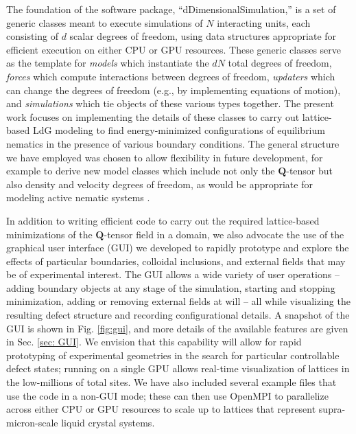 \documentclass[utf8]{frontiersFPHY} %
\newcommand{\Q}{\mathbf{Q}}
\begin{document}
The foundation of the software package, ``dDimensionalSimulation,'' is a set of generic classes meant to execute simulations of $N$ interacting units, each consisting of $d$ scalar degrees of freedom, using data structures appropriate for efficient execution on either CPU or GPU resources. These generic classes serve as the template for \emph{models} which instantiate the $dN$ total degrees of freedom, \emph{forces} which compute interactions between degrees of freedom, \emph{updaters} which can change the degrees of freedom (e.g., by implementing equations of motion), and \emph{simulations} which tie objects of these various types together. The present work focuses on implementing the details of these classes to carry out lattice-based LdG modeling to find energy-minimized configurations of equilibrium nematics in the presence of various boundary conditions. The general structure we have employed was chosen to allow flexibility in future development, for example to derive new model classes which include not only the $\Q$-tensor but also density and velocity degrees of freedom, as would be appropriate for modeling active nematic systems \citep{2019arXiv190601129C,marenduzzo2007steady,cates2009lattice,giomi2011excitable}. 

In addition to writing efficient code to carry out the required lattice-based minimizations of the $\Q$-tensor field in a domain, we also advocate the use of the graphical user interface (GUI) we developed to rapidly prototype and explore the effects of particular boundaries, colloidal inclusions, and external fields that may be of experimental interest. The GUI allows a wide variety of user operations -- adding boundary objects at any stage of the simulation, starting and stopping minimization, adding or removing external fields at will --  all while visualizing the resulting defect structure and recording configurational details. A snapshot of the GUI is shown in Fig. \ref{fig:gui}, and more details of the available features are given in Sec. \ref{sec: GUI}. We envision that this capability will allow for rapid prototyping of experimental geometries in the search for particular controllable defect states; running on a single GPU allows real-time visualization of lattices in the low-millions of total sites. We have also included several example files that use the code in a non-GUI mode; these can then use OpenMPI to parallelize across either CPU or GPU resources to scale up to lattices that represent supra-micron-scale liquid crystal systems. %
\end{document}
